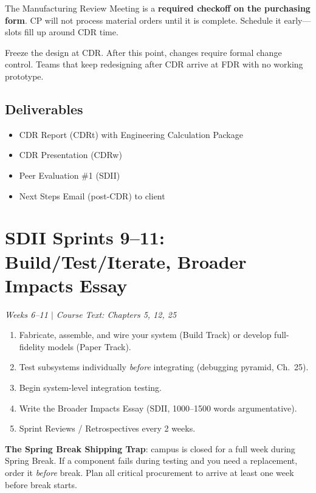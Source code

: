\documentclass[11pt,letterpaper]{article}
\begin{document}
\begin{warnbox}
The Manufacturing Review Meeting is a \textbf{required checkoff on the purchasing form}. CP will not process material orders until it is complete. Schedule it early---slots fill up around CDR time.
\end{warnbox}

\begin{protip}
Freeze the design at CDR. After this point, changes require formal change control. Teams that keep redesigning after CDR arrive at FDR with no working prototype.
\end{protip}

\subsection{Deliverables}
\begin{itemize}[nosep,leftmargin=1.5em]
\item CDR Report (CDRt) with Engineering Calculation Package
\item CDR Presentation (CDRw)
\item Peer Evaluation \#1 (SDII)
\item Next Steps Email (post-CDR) to client
\end{itemize}


\section{SDII Sprints 9--11: Build/Test/Iterate, Broader Impacts Essay}
\textit{Weeks 6--11 $|$ Course Text: Chapters 5, 12, 25}

\begin{priorities}
\begin{enumerate}[nosep]
\item Fabricate, assemble, and wire your system (Build Track) or develop full-fidelity models (Paper Track).
\item Test subsystems individually \emph{before} integrating (debugging pyramid, Ch.~25).
\item Begin system-level integration testing.
\item Write the Broader Impacts Essay (SDII, 1000--1500 words argumentative).
\item Sprint Reviews / Retrospectives every 2 weeks.
\end{enumerate}
\end{priorities}

\begin{warnbox}
\textbf{The Spring Break Shipping Trap}: campus is closed for a full week during Spring Break. If a component fails during testing and you need a replacement, order it \emph{before} break. Plan all critical procurement to arrive at least one week before break starts.
\end{warnbox}
\end{document}
